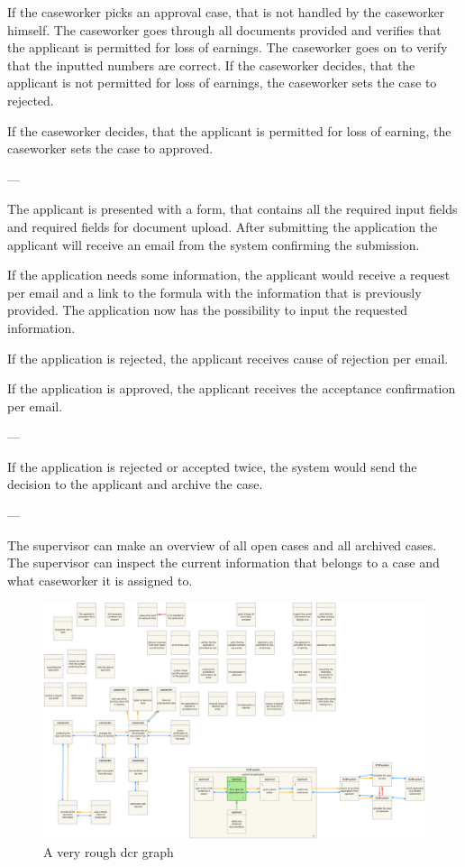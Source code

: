 If the caseworker picks an approval case, that is not handled by the caseworker himself. The caseworker goes through all documents provided and verifies that the applicant is permitted for loss of earnings. The caseworker goes on to verify that the inputted numbers are correct.
If the caseworker decides, that the applicant is not permitted for loss of earnings, the caseworker sets the case to rejected.

If the caseworker decides, that the applicant is permitted for loss of earning, the caseworker sets the case to approved.

---

The applicant is presented with a form, that contains all the required input fields and required fields for document upload. After submitting the application the applicant will receive an email from the system confirming the submission.

If the application needs some information, the applicant would receive a request per email and a link to the formula with the information that is previously provided. The application now has the possibility to input the requested information. 

If the application is rejected, the applicant receives cause of rejection per email.

If the application is approved, the applicant receives the acceptance confirmation per email. 

---

If the application is rejected or accepted twice, the system would send the decision to the applicant and archive the case. 

---

The supervisor can make an overview of all open cases and all archived cases. The supervisor can inspect the current information that belongs to a case and what caseworker it is assigned to.
\newpage
\begin{figure}[htb!]
	\includegraphics[width=\textwidth]{img/dcr}
	\caption{A very rough dcr graph}
\end{figure}